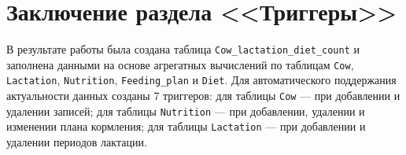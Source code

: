
\section*{Заключение раздела <<Триггеры>>}

В результате работы была создана таблица \texttt{Cow\_lactation\_diet\_count}
и заполнена данными на основе агрегатных вычислений по таблицам
\texttt{Cow}, \texttt{Lactation}, \texttt{Nutrition}, \texttt{Feeding\_plan}
и \texttt{Diet}. Для автоматического поддержания актуальности данных
созданы 7 триггеров: для таблицы \texttt{Cow} --- при добавлении
и удалении записей; для таблицы \texttt{Nutrition} --- при добавлении,
удалении и изменении плана кормления; для таблицы \texttt{Lactation} ---
при добавлении и удалении периодов лактации.